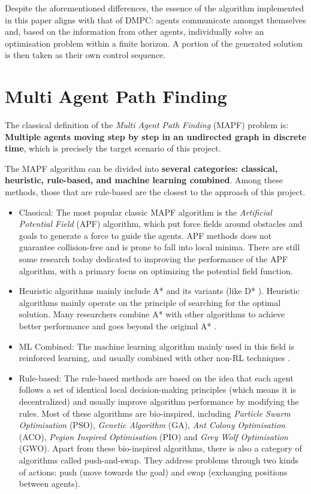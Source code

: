 Despite the aforementioned differences, the essence of the algorithm implemented in this paper aligns with that of DMPC: 
agents communicate amongst themselves and, based on the information from other agents, individually solve an optimisation problem within a finite horizon. 
A portion of the generated solution is then taken as their own control sequence.

\section{Multi Agent Path Finding}
The classical definition of the \textit{Multi Agent Path Finding} (MAPF) problem is: \textbf{Multiple agents moving step by step in an undirected graph in discrete time}\cite{MAPF_Review1}, which is precisely the target scenario of this project.

The MAPF algorithm can be divided into \textbf{several categories: classical, heuristic, rule-based, and machine learning combined}. 
Among these methods, those that are rule-based are the closest to the approach of this project.

\begin{itemize}
  \item Classical: The most popular classic MAPF algorithm is the \textit{Artificial Potential Field} (APF) algorithm, which put force fields around obstacles and goals to generate a force to guide the agents. APF methods does not guarantee collision-free and is prone to fall into local minima. There are still some research today dedicated to improving the performance of the APF algorithm, with a primary focus on optimizing the potential field function\cite{APF_improv2,APF_improv3,APF_improv4}.
  \item Heuristic algorithms mainly include A* and its variants (like  D* \cite{D*}). Heuristic algorithms mainly operate on the principle of searching for the optimal solution. Many researchers combine A* with other algorithms to achieve better performance and goes beyond the original A* \cite{A*_1,A*_2}.
  \item ML Combined: The machine learning algorithm mainly used in this field is reinforced learning, and usually combined with other non-RL techniques \cite{RL_1,RL_2,RL_3,RL_4}.
  \item Rule-based:  The rule-based methods are based on the idea that each agent follows a set of identical local decision-making principles (which means it is decentralized) and usually improve algorithm performance by modifying the rules. Most of these algorithms are bio-inspired, including \textit{Particle Swarm Optimisation} (PSO)\cite{PSO_1,PSO_2}, \textit{Genetic Algorithm} (GA)\cite{GA_1,GA_2}, \textit{Ant Colony Optimisation} (ACO)\cite{AGO_1,AGO_2}, \textit{Pegion Inspired Optimisation} (PIO)\cite{PIO_1, PIO_2} and \textit{Grey Wolf Optimisation} (GWO)\cite{GWO,GWO_1,GWO_2}. 
  Apart from these bio-inspired algorithms, there is also a category of algorithms called push-and-swap\cite{PaS_1, PaS_2}. They address problems through two kinds of actions: push (move towards the goal) and swap (exchanging positions between agents).
\end{itemize}

